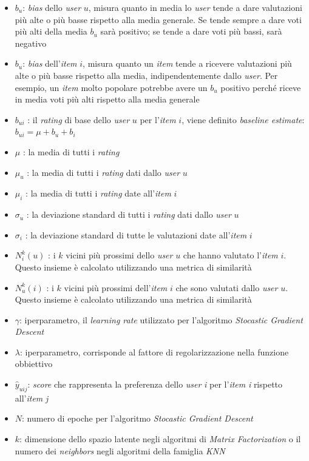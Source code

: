 \begin{itemize}
    \item $b_u$: \textit{bias} dello \textit{user} $u$, misura quanto in media lo \textit{user} tende a dare valutazioni più alte o più basse rispetto alla media generale. Se tende sempre a dare voti più alti della media $b_u$ sarà positivo; se tende a dare voti più bassi, sarà negativo
    \item $b_u$: \textit{bias} dell'\textit{item} $i$, misura quanto un \textit{item} tende a ricevere valutazioni più alte o più basse rispetto alla media, indipendentemente dallo \textit{user}. Per esempio, un \textit{item} molto popolare potrebbe avere un $b_u$ positivo perché riceve in media voti più alti rispetto alla media generale
    \item $b_{ui}$ : il \textit{rating} di base dello \textit{user} $u$ per l'\textit{item} $i$, viene definito \textit{baseline estimate}: $b_{ui} = \mu + b_u + b_i$
    \item $\mu$ : la media di tutti i \textit{rating}
    \item $\mu_u$ : la media di tutti i \textit{rating} dati dallo \textit{user} $u$
    \item $\mu_i$ : la media di tutti i \textit{rating} date all'\textit{item} $i$
    \item $\sigma_u$ : la deviazione standard di tutti i \textit{rating} dati dallo \textit{user} $u$
    \item $\sigma_i$ : la deviazione standard di tutte le valutazioni date all'\textit{item} $i$
    \item $N_i^k(u)$ : i $k$ vicini più prossimi dello \textit{user} $u$ che hanno valutato l'\textit{item} $i$. Questo insieme è calcolato utilizzando una metrica di similarità
    \item $N_u^k(i)$ : i $k$ vicini più prossimi dell'\textit{item} $i$ che sono valutati dallo \textit{user} $u$. Questo insieme è calcolato utilizzando una metrica di similarità
    \item $\gamma$: iperparametro, il \textit{learning rate} utilizzato per l'algoritmo \textit{Stocastic Gradient Descent}
    \item $\lambda$: iperparametro, corrisponde al fattore di regolarizzazione nella funzione obbiettivo
    \item $\hat{y}_{uij}$: \textit{score} che rappresenta la preferenza dello \textit{user} \textit{i} per l'\textit{item} \textit{i} rispetto all'\textit{item} \textit{j}
    \item $N$: numero di epoche per l'algoritmo \textit{Stocastic Gradient Descent}
    \item $k$: dimensione dello spazio latente negli algoritmi di \textit{Matrix Factorization} o il numero dei \textit{neighbors} negli algoritmi della famiglia \textit{KNN}
\end{itemize}

